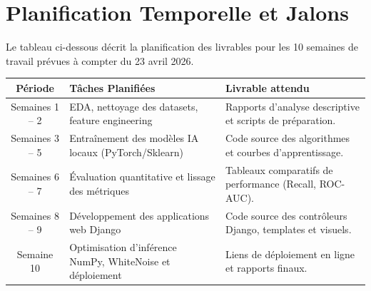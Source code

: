 \documentclass[12pt,a4paper]{article}
\begin{document}
\newpage

\section{Planification Temporelle et Jalons}

Le tableau ci-dessous décrit la planification des livrables pour les 10 semaines de travail prévues à compter du 23 avril 2026.

\bigskip

\begin{tabularx}{\linewidth}{cXX}
  \toprule
  \textbf{Période} & \textbf{Tâches Planifiées} & \textbf{Livrable attendu} \\
  \midrule
  Semaines 1 -- 2 & EDA, nettoyage des datasets, feature engineering & Rapports d'analyse descriptive et scripts de préparation. \\
  \addlinespace
  Semaines 3 -- 5 & Entraînement des modèles IA locaux (PyTorch/Sklearn) & Code source des algorithmes et courbes d'apprentissage. \\
  \addlinespace
  Semaines 6 -- 7 & Évaluation quantitative et lissage des métriques & Tableaux comparatifs de performance (Recall, ROC-AUC). \\
  \addlinespace
  Semaines 8 -- 9 & Développement des applications web Django & Code source des contrôleurs Django, templates et visuels. \\
  \addlinespace
  Semaine 10 & Optimisation d'inférence NumPy, WhiteNoise et déploiement & Liens de déploiement en ligne et rapports finaux. \\
  \bottomrule
\end{tabularx}
\end{document}
